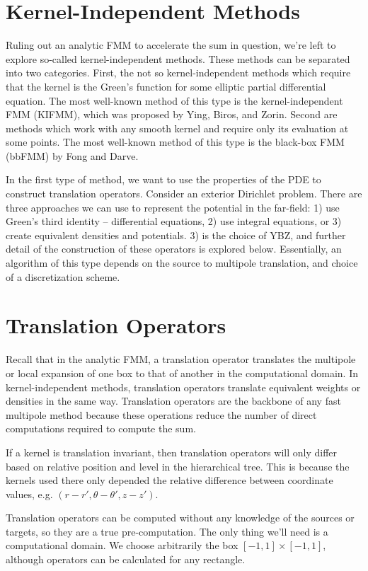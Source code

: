 \documentclass[11pt, oneside]{article}   	%
\begin{document}
\section{Kernel-Independent Methods}
Ruling out an analytic FMM to accelerate the sum in question, we're left to explore so-called kernel-independent methods. These methods can be separated into two categories. First, the not so kernel-independent methods which require that the kernel is the Green's function for some elliptic partial differential equation. The most well-known method of this type is the kernel-independent FMM (KIFMM), which was proposed by Ying, Biros, and Zorin. Second are methods which work with any smooth kernel and require only its evaluation at some points. The most well-known method of this type is the black-box FMM (bbFMM) by Fong and Darve.

In the first type of method, we want to use the properties of the PDE to construct translation operators. Consider an exterior Dirichlet problem. There are three approaches we can use to represent the potential in the far-field: 1) use Green's third identity -- differential equations, 2) use integral equations, or 3) create equivalent densities and potentials. 3) is the choice of YBZ, and further detail of the construction of these operators is explored below. Essentially, an algorithm of this type depends on the source to multipole translation, and choice of a discretization scheme.

\section{Translation Operators}
Recall that in the analytic FMM, a translation operator translates the multipole or local expansion of one box to that of another in the computational domain. In kernel-independent methods, translation operators translate equivalent weights or densities in the same way. Translation operators are the backbone of any fast multipole method because these operations reduce the number of direct computations required to compute the sum.

If a kernel is translation invariant, then translation operators will only differ based on relative position and level in the hierarchical tree. This is because the kernels used there only depended the relative difference between coordinate values, e.g. $(r-r',\theta-\theta',z-z')$.

Translation operators can be computed without any knowledge of the sources or targets, so they are a true pre-computation. The only thing we'll need is a computational domain. We choose arbitrarily the box $[-1,1]\times[-1,1]$, although operators can be calculated for any rectangle.
\end{document}
